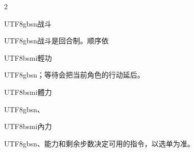 \begin{paracol}{2}
\switchcolumn
\footnotesize\setlength{\parskip}{2pt}
{\footnotesize\bfseries \begin{CJK}{UTF8}{gbsn}战斗\end{CJK}\par}
\begin{CJK}{UTF8}{gbsn}战斗是回合制。顺序依\end{CJK}\begin{CJK}{UTF8}{bsmi}輕功\end{CJK}\begin{CJK}{UTF8}{gbsn}；等待会把当前角色的行动延后。\end{CJK}\begin{CJK}{UTF8}{bsmi}體力\end{CJK}\begin{CJK}{UTF8}{gbsn}、\end{CJK}\begin{CJK}{UTF8}{bsmi}內力\end{CJK}\begin{CJK}{UTF8}{gbsn}、能力和剩余步数决定可用的指令，以选单为准。\end{CJK}\par

\end{paracol}
